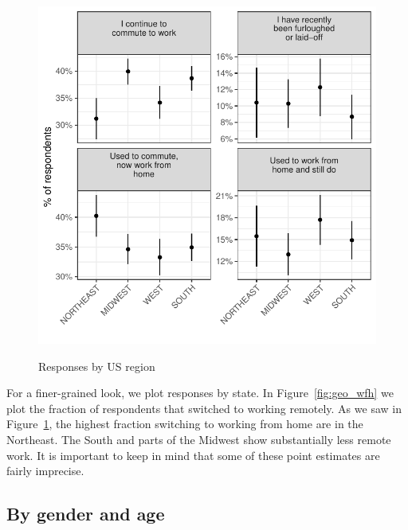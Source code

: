\documentclass[12pt]{article}
\begin{document}
\begin{figure}
  \caption{Responses by US region} \label{fig:region}
\centering
\begin{minipage}{1.0 \linewidth}
  \includegraphics[width = \linewidth]{plots/region.pdf} \\
  \begin{footnotesize}
    \end{footnotesize}
\end{minipage}
\end{figure} 

For a finer-grained look, we plot responses by state.
In Figure~\ref{fig:geo_wfh} we plot the fraction of respondents that switched to working remotely. 
As we saw in Figure~\ref{fig:region}, the highest fraction switching to working from home are in the Northeast.
The South and parts of the Midwest show substantially less remote work. 
It is important to keep in mind that some of these point estimates are fairly imprecise.


\subsection{By gender and age} \label{sec:gender}
\end{document}
